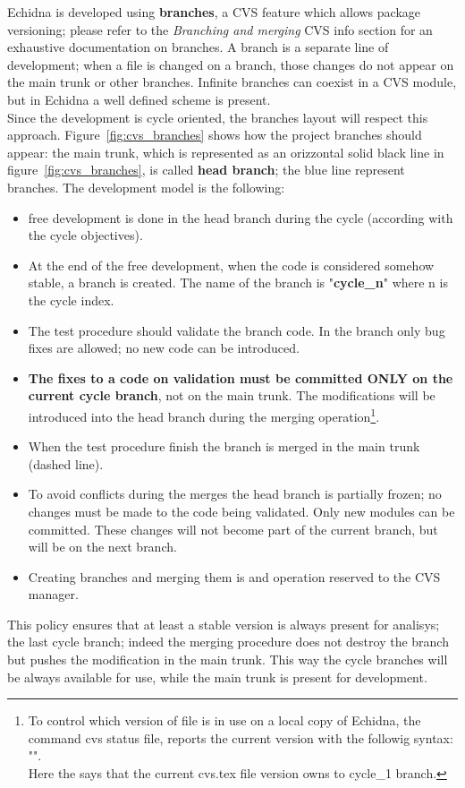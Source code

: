 Echidna is developed using {\bf branches}, a CVS feature which allows package versioning; please
refer to the {\it Branching and merging} CVS info section for an exhaustive documentation on
branches. A branch is a separate line of development; when a file is changed on a branch, those changes
do not appear on the main trunk or other branches. Infinite branches can coexist in a CVS module, but
in Echidna a well defined scheme is present.\\
Since the development is cycle oriented, the branches layout will respect this approach. Figure~\ref{fig:cvs_branches}
shows how the project branches should appear: the main trunk, which is represented as an orizzontal 
solid black line in figure~\ref{fig:cvs_branches}, is called {\bf head branch}; the blue line represent
branches. The development model is the following:
\begin{itemize}
\item free development is done in the head branch during the cycle (according with the cycle objectives).
\item At the end of the free development, when the code is considered somehow stable, a branch is created.
The name of the branch is "{\bf cycle\_n}" where n is the cycle index.
\item The test procedure should validate the branch code. In the branch only bug fixes are allowed; no new code
can be introduced.
\item {\bf The fixes to a code on validation must be committed ONLY on the current cycle branch}, not on the main
trunk. The modifications will be introduced into the head branch during the merging operation\footnote{To control
which version of file is in use on a local copy of Echidna, the command cvs status file, reports the current version
with the followig syntax: "".\\
Here the  says that the current cvs.tex file version owns to cycle\_1 branch.
}.
\item When the test procedure finish the branch is merged in the main trunk (dashed line). 
\item To avoid conflicts during the merges the head branch is partially frozen; no changes must be made
to the code being validated. Only new modules can be committed. These changes will not become part of the
current branch, but will be on the next branch.
\item Creating branches and merging them is and operation reserved to the CVS manager. 
\end{itemize}
This policy ensures that at least a stable version is always present for analisys; the last cycle branch;
indeed the merging procedure does not destroy the branch but pushes the modification in the main trunk.
This way the cycle branches will be always available for use, while the main trunk is present for development.

